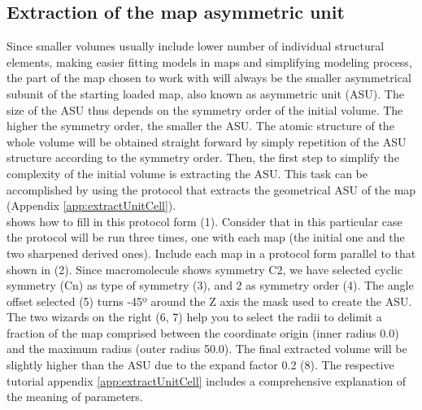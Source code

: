 \subsection*{Extraction of the map asymmetric unit}
Since smaller volumes usually include lower number of individual structural elements, making easier fitting models in maps and simplifying modeling process, the part of the map chosen to work with will always be the smaller asymmetrical subunit of the starting loaded map, also known as asymmetric unit (ASU). The size of the ASU thus depends on the symmetry order of the initial volume. The higher the symmetry order, the smaller the ASU. The atomic structure of the whole volume will be obtained straight forward by simply repetition of the ASU structure according to the symmetry order. Then, the first step to simplify the complexity of the initial volume is extracting the ASU. This task can be accomplished by using the \scipion protocol  that extracts the geometrical ASU of the map (Appendix \ref{app:extractUnitCell}).\\

 shows how to fill in this protocol form (1). Consider that in this particular case the protocol will be run three times, one with each map (the initial one and the two sharpened derived ones). Include each map in a protocol form parallel to that shown in  (2). Since  macromolecule shows symmetry C2, we have selected cyclic symmetry (Cn) as type of symmetry (3), and 2 as symmetry order (4). The angle offset selected (5) turns -45º around the Z axis the mask used to create the ASU. 
The two wizards on the right (6, 7) help you to select the radii to delimit a fraction of the map comprised between the coordinate origin (inner radius 0.0) and the maximum radius (outer radius 50.0). The final extracted volume will be slightly higher than the ASU due to the expand factor 0.2 (8). %
The respective tutorial appendix \ref{app:extractUnitCell} includes a comprehensive explanation of the meaning of parameters. 

